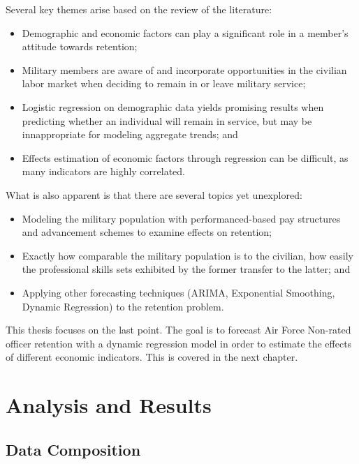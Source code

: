 \documentclass[12pt,letterpaper,toc=flat,oneside]{report}
\providecommand{\tightlist}{%
\setlength{\itemsep}{0pt}\setlength{\parskip}{0pt}}
\theoremstyle{definition}
\theoremstyle{definition}
\theoremstyle{definition}
\theoremstyle{remark}
\begin{document}
Several key themes arise based on the review of the literature:

\begin{itemize}
\tightlist
\item
  Demographic and economic factors can play a significant role in a
  member's attitude towards retention;
\item
  Military members are aware of and incorporate opportunities in the
  civilian labor market when deciding to remain in or leave military
  service;
\item
  Logistic regression on demographic data yields promising results when
  predicting whether an individual will remain in service, but may be
  innappropriate for modeling aggregate trends; and
\item
  Effects estimation of economic factors through regression can be
  difficult, as many indicators are highly correlated.
\end{itemize}

What is also apparent is that there are several topics yet unexplored:

\begin{itemize}
\tightlist
\item
  Modeling the military population with performanced-based pay
  structures and advancement schemes to examine effects on retention;
\item
  Exactly how comparable the military population is to the civilian, how
  easily the professional skills sets exhibited by the former transfer
  to the latter; and
\item
  Applying other forecasting techniques (ARIMA, Exponential Smoothing,
  Dynamic Regression) to the retention problem.
\end{itemize}

This thesis focuses on the last point. The goal is to forecast Air Force
Non-rated officer retention with a dynamic regression model in order to
estimate the effects of different economic indicators. This is covered
in the next chapter.

\newpage

\hypertarget{analysis-and-results}{%
\chapter{Analysis and Results}\label{analysis-and-results}}

\hypertarget{data-composition}{%
\section{Data Composition}\label{data-composition}}
\end{document}
